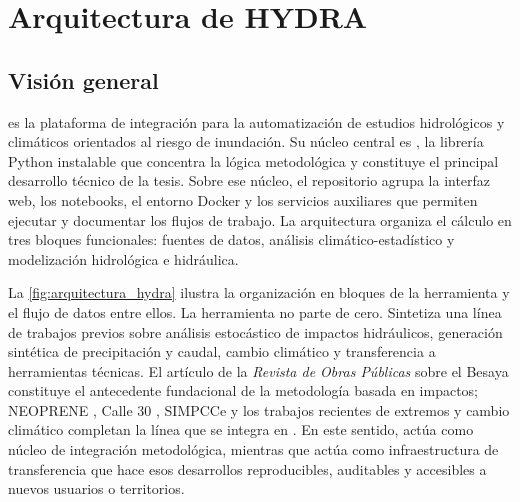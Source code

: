 \chapter{Arquitectura de HYDRA}
\label{ch:arquitectura}

\section{Visión general}

\hydra es la plataforma de integración para la automatización de estudios hidrológicos y climáticos orientados al riesgo de inundación. Su núcleo central es \pyhydra, la librería Python instalable que concentra la lógica metodológica y constituye el principal desarrollo técnico de la tesis. Sobre ese núcleo, el repositorio \hydra agrupa la interfaz web, los notebooks, el entorno Docker y los servicios auxiliares que permiten ejecutar y documentar los flujos de trabajo. La arquitectura organiza el cálculo en tres bloques funcionales: fuentes de datos, análisis climático-estadístico y modelización hidrológica e hidráulica.

La \cref{fig:arquitectura_hydra} ilustra la organización en bloques de la herramienta y el flujo de datos entre ellos. La herramienta no parte de cero. Sintetiza una línea de trabajos previos sobre análisis estocástico de impactos hidráulicos, generación sintética de precipitación y caudal, cambio climático y transferencia a herramientas técnicas. El artículo de la \textit{Revista de Obras Públicas} sobre el Besaya \parencite{navas2018besaya} constituye el antecedente fundacional de la metodología basada en impactos; NEOPRENE \parencite{diezsierra2023neoprene}, Calle 30 \parencite{navas2024calle30}, SIMPCCe \parencite{navas2025simpce} y los trabajos recientes de extremos y cambio climático completan la línea que se integra en \pyhydra \parencite{navas2025valenciaIA,navas2025tanganicaIA}. En este sentido, \pyhydra actúa como núcleo de integración metodológica, mientras que \hydra actúa como infraestructura de transferencia que hace esos desarrollos reproducibles, auditables y accesibles a nuevos usuarios o territorios.

